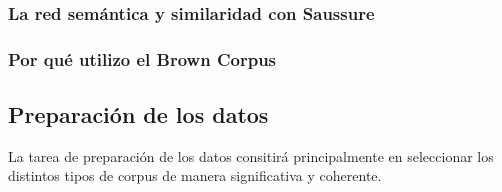 \documentclass[twoside]{article}
\begin{document}
\subsubsection{La red semántica y similaridad con Saussure}
\label{sec:org551158e}
\subsubsection{Por qué utilizo el Brown Corpus}
\label{sec:org635a761}
\subsection{Preparación de los datos}
\label{sec:org8166c51}
La tarea de preparación de los datos consitirá principalmente
en seleccionar los distintos tipos de corpus de manera significativa y coherente.
\end{document}
